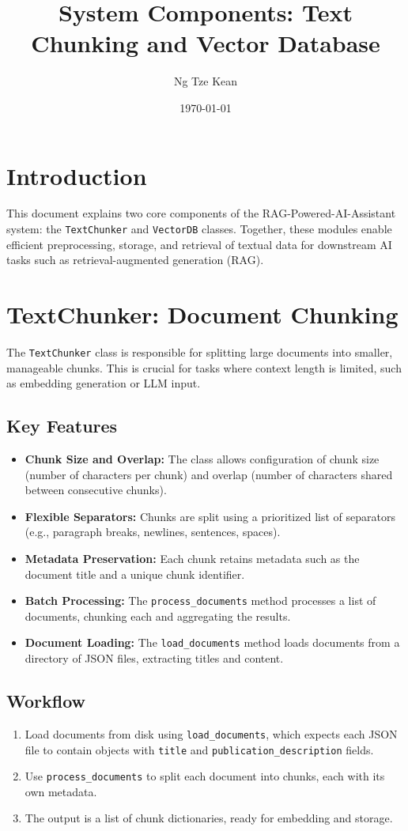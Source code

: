 \documentclass{article}
\title{System Components: Text Chunking and Vector Database}
\author{Ng Tze Kean}
\date{\today}
\begin{document}
\maketitle

\section{Introduction}
This document explains two core components of the RAG-Powered-AI-Assistant system: the \texttt{TextChunker} and \texttt{VectorDB} classes. Together, these modules enable efficient preprocessing, storage, and retrieval of textual data for downstream AI tasks such as retrieval-augmented generation (RAG).




\section{TextChunker: Document Chunking}
The \texttt{TextChunker} class is responsible for splitting large documents into smaller, manageable chunks. This is crucial for tasks where context length is limited, such as embedding generation or LLM input.

\subsection*{Key Features}
\begin{itemize}
    \item \textbf{Chunk Size and Overlap:} The class allows configuration of chunk size (number of characters per chunk) and overlap (number of characters shared between consecutive chunks).
    \item \textbf{Flexible Separators:} Chunks are split using a prioritized list of separators (e.g., paragraph breaks, newlines, sentences, spaces).
    \item \textbf{Metadata Preservation:} Each chunk retains metadata such as the document title and a unique chunk identifier.
    \item \textbf{Batch Processing:} The \texttt{process\_documents} method processes a list of documents, chunking each and aggregating the results.
    \item \textbf{Document Loading:} The \texttt{load\_documents} method loads documents from a directory of JSON files, extracting titles and content.
\end{itemize}

\subsection*{Workflow}
\begin{enumerate}
    \item Load documents from disk using \texttt{load\_documents}, which expects each JSON file to contain objects with \texttt{title} and \texttt{publication\_description} fields.
    \item Use \texttt{process\_documents} to split each document into chunks, each with its own metadata.
    \item The output is a list of chunk dictionaries, ready for embedding and storage.
\end{enumerate}
\end{document}
